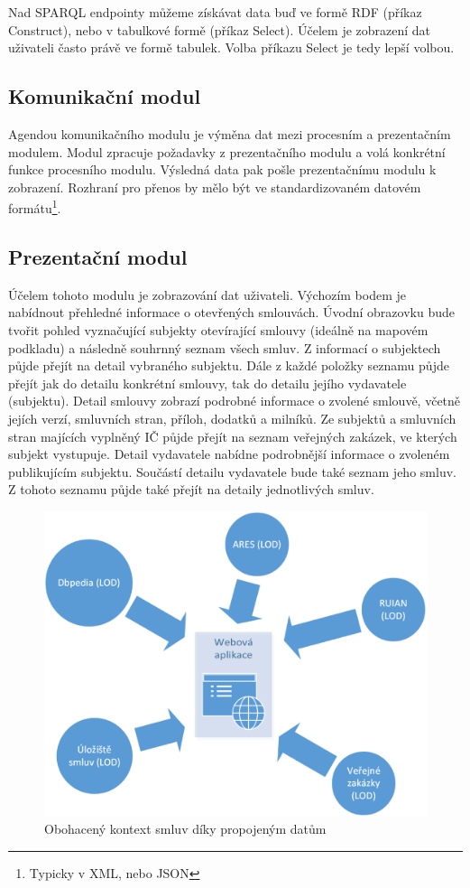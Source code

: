 Nad SPARQL endpointy můžeme získávat data buď ve formě RDF (příkaz Construct), nebo v tabulkové formě (příkaz Select). Účelem je zobrazení dat uživateli často právě ve formě tabulek. Volba příkazu Select je tedy lepší volbou.

\subsection*{Komunikační modul}

Agendou komunikačního modulu je výměna dat mezi procesním a prezentačním modulem. Modul zpracuje požadavky z prezentačního modulu a volá konkrétní funkce procesního modulu. Výsledná data pak pošle prezentačnímu modulu k zobrazení. Rozhraní pro přenos by mělo být ve standardizovaném datovém formátu\footnote{Typicky v XML, nebo JSON}.

\subsection*{Prezentační modul}

Účelem tohoto modulu je zobrazování dat uživateli. Výchozím bodem je nabídnout přehledné informace o otevřených smlouvách. Úvodní obrazovku bude tvořit pohled vyznačující subjekty otevírající smlouvy (ideálně na mapovém podkladu) a následně souhrnný seznam všech smluv. Z informací o subjektech půjde přejít na detail vybraného subjektu. Dále z každé položky seznamu půjde přejít jak do detailu konkrétní smlouvy, tak do detailu jejího vydavatele (subjektu). Detail smlouvy zobrazí podrobné informace o zvolené smlouvě, včetně jejích verzí, smluvních stran, příloh, dodatků a milníků. Ze subjektů a smluvních stran majících vyplněný IČ půjde přejít na seznam veřejných zakázek, ve kterých subjekt vystupuje. Detail vydavatele nabídne podrobnější informace o zvoleném publikujícím subjektu. Součástí detailu vydavatele bude také seznam jeho smluv. Z tohoto seznamu půjde také přejít na detaily jednotlivých smluv.

\begin{figure}[H]
\centerline{\includegraphics[width=120mm]{img/linkedDataAdv.eps}}
\caption{Obohacený kontext smluv díky propojeným datům}
\label{obr:linkedDataAdv}
\end{figure}
